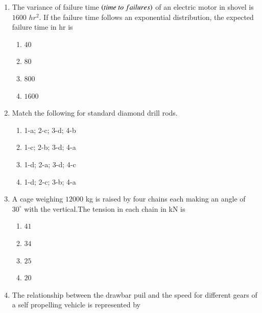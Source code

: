 \documentclass[journal,12pt,onecolumn]{IEEEtran}
\theoremstyle{remark}
\begin{document}
\begin{enumerate}
\hfill{}
\begin{multicols}{4}
\begin{enumerate}
\item $24.8$
\item $12.4$
\item $8.0$
\item $4.0$
\end{enumerate}
\end{multicols}
\item The variance of failure time $\left(time\ to\ failures\right)$ of an electric motor in shovel is $1600$ $hr^2$. If the failure time follows an exponential distribution, the expected failure time in hr is

\hfill{}
\begin{multicols}{4}
\begin{enumerate}
\item $40$
\item $80$
\item $800$
\item $1600$
\end{enumerate}
\end{multicols}
\item Match the following for standard diamond drill rods.
\begin{table}[H]
  
\end{table}
\vspace{0.5em}
\hfill{}


\vspace{0.5em}

\begin{multicols}{2}
\begin{enumerate}
\item  1-a; 2-c; 3-d; 4-b  
\item 1-c; 2-b; 3-d; 4-a  
\item  1-d; 2-a; 3-d; 4-c  
\item 1-d; 2-c; 3-b; 4-a
  
\end{enumerate}
\end{multicols}
\item A cage weighing $12000$ kg is raised by four chains each making an angle of $30^\circ$ with the vertical.The tension in each chain in kN is

\hfill{}
\begin{multicols}{4}
\begin{enumerate}
\item $41$
\item $34$
\item $25$
\item $20$
\end{enumerate}
\end{multicols}
\item The relationship between the drawbar puil and the speed for different gears of a self propelling vehicle is represented by


\end{enumerate}
\end{document}
